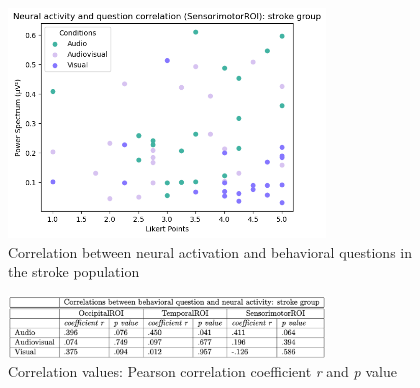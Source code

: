 \begin{figure}[H]
    \centering
    \includegraphics[width=0.75\textwidth]{scatter_plots/s_sensorimotor_q2.png}
    \caption{Correlation between neural activation and behavioral questions in the stroke population}
    \label{fig: correlation q2 sensorimotorROI: stroke group} 
\end{figure}
\begin{figure}[H]
    \centering
    \includegraphics[width=0.75\textwidth]{scatter_plots/correlation_q2_stroke.png}
    \caption{Correlation values: Pearson correlation coefficient \textit{r} and \textit{p} value}
    \label{fig: correlation values q2: stroke} 
\end{figure}

\clearpage
